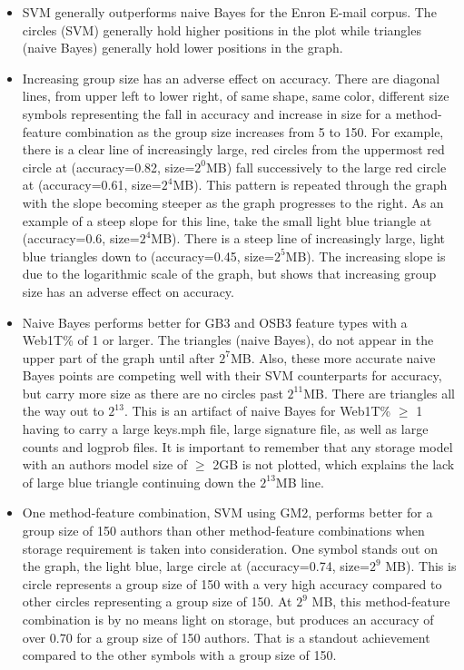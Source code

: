 \begin{itemize}
		\item SVM generally outperforms naive Bayes for the Enron E-mail corpus. The circles (SVM) generally hold higher positions in the plot while triangles (naive Bayes) generally hold lower positions in the graph. 
		\item Increasing group size has an adverse effect on accuracy. There are diagonal lines, from upper left to lower right, of same shape, same color, different size symbols representing the fall in accuracy and increase in size for a method-feature combination as the group size increases from 5 to 150.  For example, there is a clear line of increasingly large, red circles from the uppermost red circle at (accuracy=0.82, size=$2^0$MB) fall successively to the large red circle at (accuracy=0.61, size=$2^4$MB).  This pattern is repeated through the graph with the slope becoming steeper as the graph progresses to the right.  As an example of a steep slope for this line, take the small light blue triangle at (accuracy=0.6, size=$2^4$MB).  There is a steep line of increasingly large, light blue triangles down to (accuracy=0.45, size=$2^5$MB).  The increasing slope is due to the logarithmic scale of the graph, but shows that increasing group size has an adverse effect on accuracy.
		\item Naive Bayes performs better for GB3 and OSB3 feature types with a Web1T\% of 1 or larger. The triangles (naive Bayes), do not appear in the upper part of the graph until after $2^7$MB.  Also, these more accurate naive Bayes points are competing well with their SVM counterparts for accuracy, but carry more size as there are no circles past $2^{11}$MB. There are triangles all the way out to $2^{13}$.  This is an artifact of naive Bayes for Web1T\% $\ge$ 1 having to carry a large keys.mph file, large signature file, as well as large counts and logprob files. It is important to remember that any storage model with an authors model size of $\ge$ 2GB is not plotted, which explains the lack of large blue triangle continuing down the $2^{13}$MB line.
		\item One method-feature combination, SVM using GM2, performs better for a group size of 150 authors than other method-feature combinations when storage requirement is taken into consideration.  One symbol stands out on the graph, the light blue, large circle at (accuracy=0.74, size=$2^9$ MB).  This is circle represents a group size of 150 with a very high accuracy compared to other circles representing a group size of 150.  At $2^9$ MB, this method-feature combination is by no means light on storage, but produces an accuracy of over 0.70 for a group size of 150 authors.  That is a standout achievement compared to the other symbols with a group size of 150.

\end{itemize}
